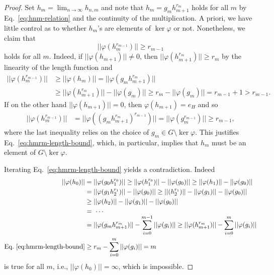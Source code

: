 \documentclass[12pt]{paper}
\numberwithin{equation}{section}
\theoremstyle{plain}
\theoremstyle{definition}
\newcommand{\norm}[1]{||#1||}
\renewcommand{\phi}{\varphi}
\begin{document}
\begin{proof}
  Set \(h_{m} = \lim_{n \to \infty} h_{n,m}\) and note that \(h_{m} = g_{m}h_{m+1}^{r_{m}}\) holds
  for all \(m\) by Eq.~\eqref{eq:hnm-relation} and the continuity of the multiplication.  A priori,
  we have little control as to whether \(h_{m}\)'s are elements of \(\ker \phi\) or not.
  Nonetheless, we claim that
  \begin{equation}
    \label{eq:hmrm-length-bound}
    \norm{\phi(h_{m}^{r_{m-1}})} \ge r_{m-1}
  \end{equation}
  holds for all \(m\).  Indeed, if \(\norm{\phi(h_{m+1})} \ne 0\), then
  \(\norm{\phi (h^{r_{m}}_{m+1})} \ge r_{m} \) by the linearity of the length function and
  \begin{displaymath}
    \begin{aligned}
      \norm{\phi(h^{r_{m-1}}_{m})}
      &\ge \norm{\phi (h_{m})} = \norm{\phi(g_{m}h_{m+1}^{r_{m}})} \\
      &\ge\norm{\phi (h_{m+1}^{r_{m}})} - \norm{\phi(g_{m})} \ge r_{m} - \norm{\phi(g_{m})}
        = r_{m-1} +1 > r_{m-1}.
    \end{aligned}
  \end{displaymath}
  If on the other hand \(\norm{\phi(h_{m+1})} = 0\), then \(\phi(h_{m+1}) = e_{H}\) and so
  \begin{displaymath}
    \begin{aligned}
      \norm{\phi(h_{m}^{r_{m-1}})}
      &= \norm{\phi((g_{m}h_{m+1}^{r_{m}})^{r_{m-1}})} = \norm{\phi(g_{m}^{r_{m-1}})} \ge r_{m-1},
    \end{aligned}
  \end{displaymath}
  where the last inequality relies on the choice of \(g_{m} \in G \setminus \ker \phi \).  This
  justifies Eq.~\eqref{eq:hmrm-length-bound}, which, in particular, implies that \(h_{m}\) must be
  an element of \(G \setminus \ker \phi\).

  Iterating Eq.~\eqref{eq:hmrm-length-bound} yields a contradiction.  Indeed
  \begin{displaymath}
    \begin{aligned}
      \norm{\phi(h_{0})}
      &= \norm{\phi(g_{0}h_{1}^{r_{0}})} \ge \norm{\phi(h_{1}^{r_{0}})} - \norm{\phi(g_{0})}
        \ge \norm{\phi(h_{1})} - \norm{\phi(g_{0})} \\
      &= \norm{\phi(g_{1}h_{2}^{r_{1}})} - \norm{\phi(g_{0})}
        \ge \norm{(h_{2}^{r_{1}})} - \norm{\phi(g_{1})} - \norm{\phi(g_{0})} \\
      &\ge  \norm{\phi(h_{2})} - \norm{\phi(g_{1})} - \norm{\phi(g_{0})}\\
      &= \ \cdots \\[-5pt]
      &= \norm{\phi(g_{m}h_{m+1}^{r_{m}})} - \sum_{i=0}^{m-1}\norm{\phi(g_{i})}
        \ge \norm{\phi(h_{m+1}^{r_{m}})} - \sum_{i=0}^{m}\norm{\phi(g_{i})} \\
      \textrm{Eq.~\eqref{eq:hmrm-length-bound}} &\ge r_{m} - \sum_{i=0}^{m}\norm{\phi(g_{i})} = m
    \end{aligned}
  \end{displaymath}
  is true for all \(m\), i.e., \(\norm{\phi(h_{0})} = \infty\), which is impossible.


\end{proof}
\end{document}
